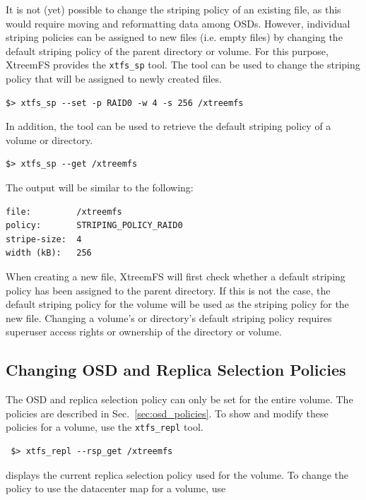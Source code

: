 \documentclass[a4paper,10pt]{book}
\begin{document}
It is not (yet) possible to change the striping policy of an existing file, as this would require moving and reformatting data among OSDs. However, individual striping policies can be assigned to new files (i.e. empty files) by changing the default striping policy of the parent directory or volume. For this purpose, XtreemFS provides the \texttt{xtfs\_sp} tool. The tool can be used to change the striping policy that will be assigned to newly created files.

\begin{verbatim}
$> xtfs_sp --set -p RAID0 -w 4 -s 256 /xtreemfs
\end{verbatim}

In addition, the tool can be used to retrieve the default striping policy of a volume or directory.

\begin{verbatim}
$> xtfs_sp --get /xtreemfs
\end{verbatim}

The output will be similar to the following:

\begin{verbatim}
file:         /xtreemfs
policy:       STRIPING_POLICY_RAID0
stripe-size:  4
width (kB):   256
\end{verbatim}

When creating a new file, XtreemFS will first check whether a default striping policy has been assigned to the parent directory. If this is not the case, the default striping policy for the volume will be used as the striping policy for the new file. Changing a volume's or directory's default striping policy requires superuser access rights or ownership of the directory or volume.

\subsection{Changing OSD and Replica Selection Policies}\label{sec:osd_select_policy}

The OSD and replica selection policy can only be set for the entire volume. The policies are described in Sec.\ \ref{sec:osd_policies}. To show and modify these policies for a volume, use the \texttt{xtfs\_repl} tool.

\begin{verbatim}
 $> xtfs_repl --rsp_get /xtreemfs
\end{verbatim}

displays the current replica selection policy used for the volume. To change the policy to use the datacenter map for  a volume, use
\end{document}
